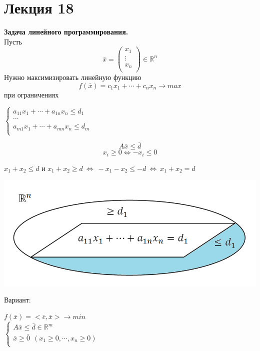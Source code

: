\documentclass[12pt]{article}
\theoremstyle{definition}
\numberwithin{equation}{section}
\begin{document}
\section *{Лекция 18}
\noindent\textbf{Задача линейного программирования.}\\
Пусть \[\bar x=\begin{pmatrix}
x_1\\
\vdots\\
x_n\\
\end{pmatrix} \in \mathbb{R}^n\]
Нужно максимизировать линейную функцию $$f(\bar x)=c_1x_1+\cdots +c_nx_n \to max $$ при ограничениях
\begin{center}
$
\left\{
\begin{array}{lcl}
    a_{11}x_1+\cdots +a_{1n}x_n \leqslant d_1\\
    \cdots\\
    a_{m1}x_1+\cdots +a_{mn}x_n \leqslant d_m\\
\end{array}
\right.
$
\end{center}
$$A\bar x \leqslant \bar d$$
$$x_i \geqslant 0 \Leftrightarrow -x_i \leqslant 0$$
\begin{center}
$x_1+x_2 \leqslant d$ и $x_1+x_2 \geqslant d~\Leftrightarrow~-x_1-x_2\leqslant -d~\Leftrightarrow~x_1+x_2=d$
\end{center}
\begin{center}
\includegraphics[scale=0.6]{l18_1.png}\\
\end{center}
Вариант:
\begin{center}
$f(\bar x)=<\bar c, \bar x> \to min$\\
$
\left\{
\begin{array}{lcl}
   A\bar x \leqslant \bar d \in \mathbb{R}^m\\
   \bar x \geqslant \bar 0 ~~(x_1\geqslant 0, \cdots, x_n \geqslant 0)\\
\end{array}
\right.
$
\end{center}
\end{document}
